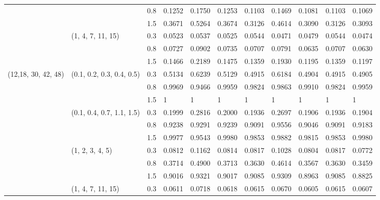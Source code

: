 \begin{table}[h]
\begin{tabular}{lllllllllll}
                     		&                           		& 0.8   	& 0.1252 	& 0.1750 	& 0.1253 	& 0.1103 	& 0.1469 	& 0.1081 	& 0.1103 	& 0.1069 \\
                     		&                           		& 1.5   	& 0.3671 	& 0.5264 	& 0.3674	& 0.3126 	& 0.4614 	& 0.3090 	& 0.3126 	& 0.3093 \\
                     		& (1, 4, 7, 11, 15)         	& 0.3   	& 0.0523 	& 0.0537 	& 0.0525 	& 0.0544 	& 0.0471 	& 0.0479 	& 0.0544 	& 0.0474 \\
                     		&                           		& 0.8   	& 0.0727 	& 0.0902 	& 0.0735 	& 0.0707 	& 0.0791 	& 0.0635 	& 0.0707 	& 0.0630 \\
                     		&                           		& 1.5   	& 0.1466 	& 0.2189 	& 0.1475 	& 0.1359 	& 0.1930 	& 0.1195 	& 0.1359 	& 0.1197 \\\hline
(12,18, 30, 42, 48)  	& (0.1, 0.2, 0.3, 0.4, 0.5) 	& 0.3   	& 0.5134 	& 0.6239 	& 0.5129 	& 0.4915 	& 0.6184 	& 0.4904 	& 0.4915 	& 0.4905 \\
                     		&                           		& 0.8   	& 0.9969 	& 0.9466 	& 0.9959 	& 0.9824 	& 0.9863 	& 0.9910 	& 0.9824 	& 0.9959 \\
                     		&                           		& 1.5   	& 1	 	& 1	 	& 1	 	& 1	 	& 1	 	& 1	 	& 1	 	& 1	 \\
                     		& (0.1, 0.4, 0.7, 1.1, 1.5) 	& 0.3   	& 0.1999 	& 0.2816 	& 0.2000 	& 0.1936 	& 0.2697 	& 0.1906 	& 0.1936 	& 0.1904 \\
                     		&                           		& 0.8   	& 0.9238 	& 0.9291 	& 0.9239 	& 0.9091 	& 0.9556 	& 0.9046 	& 0.9091 	& 0.9183 \\
                     		&                           		& 1.5   	& 0.9977 	& 0.9543 	& 0.9980 	& 0.9853 	& 0.9882 	& 0.9815 	& 0.9853 	& 0.9980 \\
                     		& (1, 2, 3, 4, 5)          		& 0.3   	& 0.0812 	& 0.1162 	& 0.0814 	& 0.0817 	& 0.1028 	& 0.0804 	& 0.0817 	& 0.0772 \\
                     		&                           		& 0.8   	& 0.3714 	& 0.4900 	& 0.3713 	& 0.3630 	& 0.4614 	& 0.3567 	& 0.3630 	& 0.3459 \\
                     		&                           		& 1.5   	& 0.9016 	& 0.9321 	& 0.9017 	& 0.9085 	& 0.9309 	& 0.8963 	& 0.9085 	& 0.8825 \\
                     		& (1, 4, 7, 11, 15)         	& 0.3   	& 0.0611 	& 0.0718 	& 0.0618 	& 0.0615 	& 0.0670 	& 0.0605 	& 0.0615 	& 0.0607 \\

\end{tabular}
\end{table}
